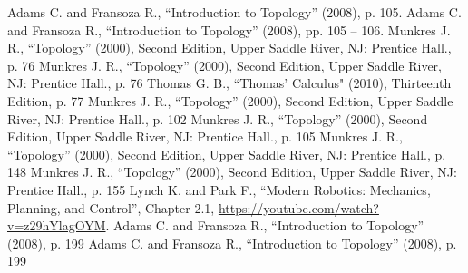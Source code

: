 \documentclass[12pt]{article}
\theoremstyle{definition}
\begin{document}
\begin{center}
\begin{thebibliography}{00}
     Adams C. and Fransoza R., ``Introduction to Topology'' (2008), p. 105.
     Adams C. and Fransoza R., ``Introduction to Topology'' (2008), pp. 105 -- 106.
     Munkres J. R., ``Topology'' (2000), Second Edition, Upper Saddle River, NJ: Prentice Hall., p. 76
     Munkres J. R., ``Topology'' (2000), Second Edition, Upper Saddle River, NJ: Prentice Hall., p. 76
     Thomas G. B., ``Thomas' Calculus" (2010), Thirteenth Edition, p. 77
     Munkres J. R., ``Topology'' (2000), Second Edition, Upper Saddle River, NJ: Prentice Hall., p. 102
     Munkres J. R., ``Topology'' (2000), Second Edition, Upper Saddle River, NJ: Prentice Hall., p. 105
     Munkres J. R., ``Topology'' (2000), Second Edition, Upper Saddle River, NJ: Prentice Hall., p. 148
     Munkres J. R., ``Topology'' (2000), Second Edition, Upper Saddle River, NJ: Prentice Hall., p. 155
     Lynch K. and Park F., ``Modern Robotics: Mechanics, Planning, and Control'', Chapter 2.1, \href{https://youtube.com/watch?v=z29hYlagOYM}{https://youtube.com/watch?v=z29hYlagOYM}.
     Adams C. and Fransoza R., ``Introduction to Topology'' (2008), p. 199
     Adams C. and Fransoza R., ``Introduction to Topology'' (2008), p. 199
\end{thebibliography}
\end{center}
\end{document}
